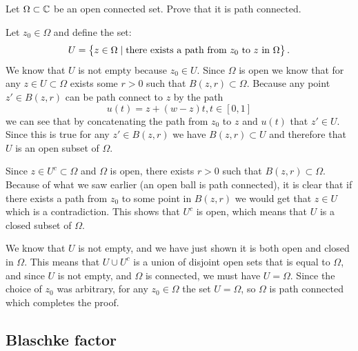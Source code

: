 \documentclass[11pt,a4paper]{article}
\begin{document}
\begin{exercise}
  Let $\Omega \subset \mathbb{C}$ be an open connected set.
  Prove that it is path connected.
\end{exercise}
\begin{solution}
  Let $z_0 \in \Omega$ and define the set:
  \[
    U = \left\{z \in \Omega \mid 
    \text{there exists a path from $z_0$ to $z$ in $\Omega$}\right\}.
  \]
  We know that $U$ is not empty because $z_0 \in U$.
  Since $\Omega$ is open we know that for any $z \in U \subset \Omega$ exists 
  some $r > 0$ such that $B(z,r) \subset \Omega$.
  Because any point $z' \in B(z,r)$ can be path connect to $z$ by
  the path
  \[
    u(t) = z + (w - z) t, t \in [0,1]
  \]
  we can see that by concatenating the path from $z_0$ to $z$ and $u(t)$
  that $z' \in U$.
  Since this is true for any $z' \in B(z,r)$ we have $B(z,r) \subset U$
  and therefore that $U$ is an open subset of $\Omega$.

  Since $z \in U^c \subset \Omega$ and $\Omega$ is open, there exists $r > 0$
  such that $B(z,r) \subset \Omega$.
  Because of what we saw earlier (an open ball is path connected), it is
  clear that if there exists a path from $z_0$ to some point in $B(z,r)$
  we would get that $z \in U$ which is a contradiction.
  This shows that $U^c$ is open, which means that $U$ is a closed subset of
  $\Omega$.

  We know that $U$ is not empty, and we have just shown it is both open and 
  closed in $\Omega$. 
  This means that $U \cup U^c$ is a union of disjoint open sets that is equal 
  to $\Omega$, and since $U$ is not empty, and $\Omega$ is connected, 
  we must have $U = \Omega$. Since the choice of $z_0$ was arbitrary, 
  for any $z_0 \in \Omega$ the set $U = \Omega$, so $\Omega$ is 
  path connected which completes the proof.
\end{solution}

\newpage

\subsection{Blaschke factor}
\end{document}
